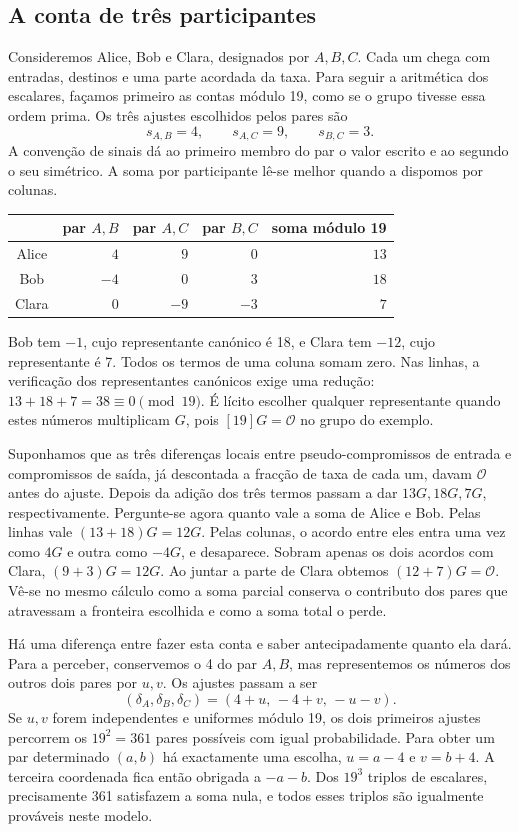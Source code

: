 \subsection{A conta de três participantes}
\label{subsec:txtangle-tres-participantes}

Consideremos Alice, Bob e Clara, designados por \(A,B,C\). Cada um chega
com entradas, destinos e uma parte acordada da taxa. Para seguir a
aritmética dos escalares, façamos primeiro as contas módulo 19, como se
o grupo tivesse essa ordem prima. Os três ajustes escolhidos pelos pares
são
\[
              s_{A,B}=4,\qquad s_{A,C}=9,\qquad s_{B,C}=3 .
\]
A convenção de sinais dá ao primeiro membro do par o valor escrito
e ao segundo o seu simétrico. A soma por participante lê-se melhor
quando a dispomos por colunas.
\begin{center}
\begin{tabular}{c|rrr|r}
 &par \(A,B\)&par \(A,C\)&par \(B,C\)&soma módulo 19\\
\hline
Alice &\(4\)&\(9\)&\(0\)&\(13\)\\
Bob &\(-4\)&\(0\)&\(3\)&\(18\)\\
Clara &\(0\)&\(-9\)&\(-3\)&\(7\)
\end{tabular}
\end{center}

Bob tem \(-1\), cujo representante canónico é 18, e Clara tem \(-12\),
cujo representante é 7. Todos os termos de uma coluna somam zero. Nas
linhas, a verificação dos representantes canónicos exige uma redução:
\(13+18+7=38\equiv0\pmod{19}\). É lícito escolher qualquer
representante quando estes números multiplicam \(G\), pois
\([19]G=\mathcal O\) no grupo do exemplo.

Suponhamos que as três diferenças locais entre pseudo-compromissos de
entrada e compromissos de saída, já descontada a fracção de taxa de
cada um, davam \(\mathcal O\) antes do ajuste. Depois da adição dos
três termos passam a dar \(13G,18G,7G\), respectivamente. Pergunte-se
agora quanto vale a soma de Alice e Bob. Pelas linhas vale
\((13+18)G=12G\). Pelas colunas, o acordo entre eles entra uma vez como
\(4G\) e outra como \(-4G\), e desaparece. Sobram apenas os dois
acordos com Clara, \((9+3)G=12G\). Ao juntar a parte de Clara
obtemos \((12+7)G=\mathcal O\). Vê-se no mesmo cálculo como a soma
parcial conserva o contributo dos pares que atravessam a fronteira
escolhida e como a soma total o perde.

Há uma diferença entre fazer esta conta e saber antecipadamente quanto
ela dará. Para a perceber, conservemos o 4 do par \(A,B\), mas
representemos os números dos outros dois pares por \(u,v\). Os ajustes
passam a ser
\[
            (\delta_A,\delta_B,\delta_C)
                  =(4+u,\,-4+v,\,-u-v).
\]
Se \(u,v\) forem independentes e uniformes módulo 19, os dois
primeiros ajustes percorrem os \(19^2=361\) pares possíveis com
igual probabilidade. Para obter um par determinado \((a,b)\) há
exactamente uma escolha, \(u=a-4\) e \(v=b+4\). A terceira coordenada
fica então obrigada a \(-a-b\). Dos \(19^3\) triplos de escalares,
precisamente 361 satisfazem a soma nula, e todos esses triplos são
igualmente prováveis neste modelo.

